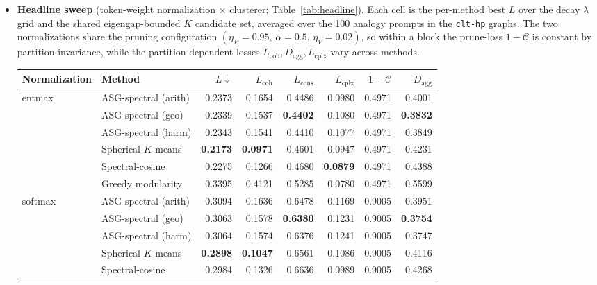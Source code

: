 \begin{itemize}[leftmargin=*,topsep=2pt,itemsep=2pt]
\item \textbf{Headline sweep} (token-weight normalization $\times$
clusterer; Table~\ref{tab:headline}). Each cell is the per-method
best $L$ over the decay $\lambda$ grid and the shared eigengap-bounded
$K$ candidate set, averaged over the 100 analogy prompts in the
\texttt{clt-hp} graphs. The two normalizations share the pruning
configuration $(\eta_E = 0.95,\, \alpha = 0.5,\, \eta_V = 0.02)$, so
within a block the prune-loss $1 - \mathcal{C}$ is constant by
partition-invariance, while the partition-dependent losses
$L_{\text{coh}}, D_{\text{agg}}, L_{\text{cplx}}$ vary across methods.

\begin{table}[t]
\centering
\small
\setlength{\tabcolsep}{6pt}
\begin{tabular}{l l r r r r r r}
\toprule
Normalization & Method & $L\downarrow$ & $L_{\text{coh}}$ & $L_{\text{cons}}$ & $L_{\text{cplx}}$ & $1-\mathcal{C}$ & $D_{\text{agg}}$ \\
\midrule
\multirow{6}{*}{entmax}
 & ASG-spectral (arith)     & 0.2373 & 0.1654 & 0.4486 & 0.0980 & 0.4971 & 0.4001 \\
 & ASG-spectral (geo)       & 0.2339 & 0.1537 & \textbf{0.4402} & 0.1080 & 0.4971 & \textbf{0.3832} \\
 & ASG-spectral (harm)      & 0.2343 & 0.1541 & 0.4410 & 0.1077 & 0.4971 & 0.3849 \\
 & Spherical $K$-means      & \textbf{0.2173} & \textbf{0.0971} & 0.4601 & 0.0947 & 0.4971 & 0.4231 \\
 & Spectral-cosine          & 0.2275 & 0.1266 & 0.4680 & \textbf{0.0879} & 0.4971 & 0.4388 \\
 & Greedy modularity        & 0.3395 & 0.4121 & 0.5285 & 0.0780 & 0.4971 & 0.5599 \\
\midrule
\multirow{6}{*}{softmax}
 & ASG-spectral (arith)     & 0.3094 & 0.1636 & 0.6478 & 0.1169 & 0.9005 & 0.3951 \\
 & ASG-spectral (geo)       & 0.3063 & 0.1578 & \textbf{0.6380} & 0.1231 & 0.9005 & \textbf{0.3754} \\
 & ASG-spectral (harm)      & 0.3064 & 0.1574 & 0.6376 & 0.1241 & 0.9005 & 0.3747 \\
 & Spherical $K$-means      & \textbf{0.2898} & \textbf{0.1047} & 0.6561 & 0.1086 & 0.9005 & 0.4116 \\
 & Spectral-cosine          & 0.2984 & 0.1326 & 0.6636 & 0.0989 & 0.9005 & 0.4268 \\

\end{tabular}
\end{table}
\end{itemize}
